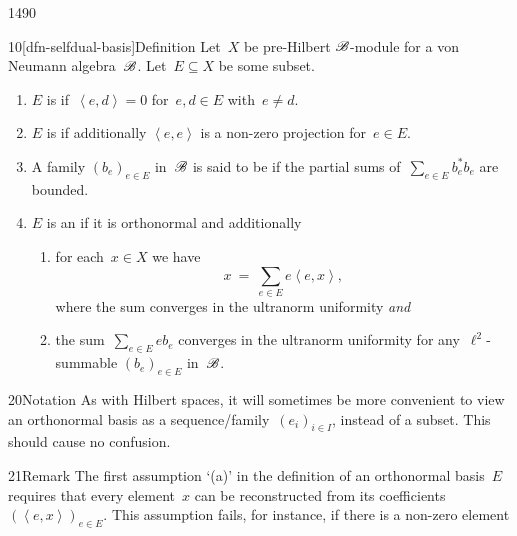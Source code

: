 \begin{parsec}{1490}%
\begin{point}{10}[dfn-selfdual-basis]{Definition}
    Let~$X$ be pre-Hilbert $\mathscr{B}$-module
        for a von Neumann algebra~$\mathscr{B}$.
    Let~$E \subseteq X$ be some subset.
    \begin{enumerate}
        \item $E$ is  if~$\left<e,d\right> = 0$
            for~$e,d \in E$ with~$e \neq d$.
        \item $E$ is  if additionally
                    $\left<e,e\right>$ is a non-zero projection
                    for~$e \in E$.
        \item A family $(b_e)_{e \in E}$ in~$\mathscr{B}$
                is said to be 
                if the partial sums of~$\sum_{e \in E} b_e^*b_e$
                are bounded.
        \item $E$ is an  if
                it is orthonormal and additionally
            \begin{enumerate}
                \item for each~$x \in X$ we have
                    \begin{equation*}
                        x \ =\  \sum_{e \in E} e\left<e,x\right>,
                    \end{equation*}
                    where the sum converges in the ultranorm uniformity
                    \emph{and}
                \item  the sum~$\sum_{e \in E} eb_e$
                        converges in the ultranorm uniformity
                    for any~$\ell^2$-summable $(b_e)_{e \in E}$
                        in~$\mathscr{B}$.
            \end{enumerate}
    \end{enumerate}
\spacingfix{}
\begin{point}{20}{Notation}%
As with Hilbert spaces, it will sometimes be more convenient
    to view an orthonormal basis as a sequence/family~$(e_i)_{i \in I}$,
    instead of a subset. This should cause no confusion.
\end{point}
\begin{point}{21}{Remark}%
The first assumption `(a)' in the definition of an orthonormal basis~$E$
    requires that every element~$x$ can be reconstructed
    from its coefficients~$(\left<e, x\right>)_{e \in E}$.
This assumption fails, for instance, if there is a non-zero element

\end{point}
\end{point}
\end{parsec}
